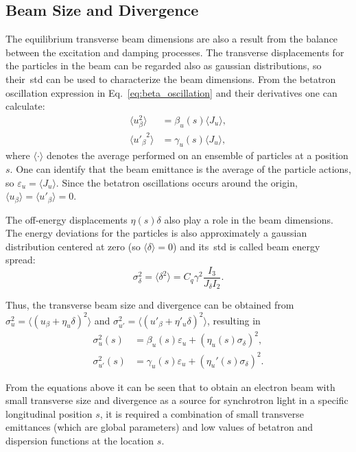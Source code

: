 \subsection{Beam Size and Divergence}
The equilibrium transverse beam dimensions are also a result from the balance between the excitation and damping processes. The transverse displacements for the particles in the beam can be regarded also as gaussian distributions, so their~\gls{std} can be used to characterize the beam dimensions. From the betatron oscillation expression in Eq.~\eqref{eq:beta_oscillation} and their derivatives one can calculate:
\begin{align}
    \langle u_{\beta}^2 \rangle &= \beta_u(s) \langle J_u \rangle,  \\
    \langle {u'_{\beta}}^{2} \rangle &= \gamma_u(s) \langle J_u \rangle,
\end{align}
where $\langle \cdot \rangle$ denotes the average performed on an ensemble of particles at a position $s$. One can identify that the beam emittance is the average of the particle actions, so $\varepsilon_u = \langle J_u \rangle$. Since the betatron oscillations occurs around the origin, $\langle u_{\beta}\rangle = \langle u'_{\beta}\rangle = 0$. 

The off-energy displacements $\eta(s)\delta$ also play a role in the beam dimensions. The energy deviations for the particles is also approximately a gaussian distribution centered at zero (so $\langle \delta \rangle = 0$) and its~\gls{std} is called beam energy spread:
\begin{equation}
    \sigma^2_{\delta} = \langle \delta ^2\rangle = C_q \gamma^2\dfrac{I_3}{J_{\delta}I_2}.
\end{equation}

Thus, the transverse beam size and divergence can be obtained from $\sigma^2_u = \langle\left(u_\beta + \eta_u \delta\right)^2\rangle$ and $\sigma^2_{u'} = \langle\left(u'_\beta + \eta'_u \delta\right)^2\rangle$, resulting in
\begin{align}
 \sigma^2_u(s) &= \beta_u (s) \varepsilon_u + \left(\eta_u(s) \sigma_{\delta}\right)^2, \\
 \sigma^2_{u'}(s) &= \gamma_u (s) \varepsilon_u + \left(\eta_{u}'(s) \sigma_{\delta}\right)^2.
\end{align}

From the equations above it can be seen that to obtain an electron beam with small transverse size and divergence as a source for synchrotron light in a specific longitudinal position $s$, it is required a combination of small transverse emittances (which are global parameters) and low values of betatron and dispersion functions at the location $s$.

